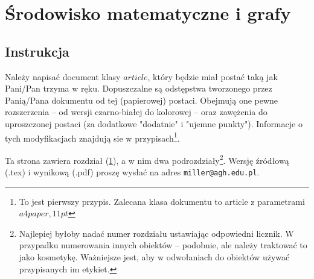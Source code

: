 \documentclass[a4paper,12pt]{article}
\begin{document}
    \section{Środowisko matematyczne i grafy}
    \label{r15}
        \subsection{Instrukcja}

        Należy napisać document klasy $article$, który będzie miał postać taką jak Pani/Pan trzyma w ręku.
        Dopuszczalne są odstępstwa tworzonego przez Panią/Pana dokumentu od tej (papierowej) postaci. Obejmują
        one pewne rozszerzenia -- od wersji czarno-białej do kolorowej -- oraz zawężenia do uproszczonej postaci (za dodatkowe "dodatnie" i "ujemne punkty"). Informacje o tych modyfikacjach znajdują sie w przypisach\footnote{To jest pierwszy przypis. Zalecana klasa dokumentu to article z parametrami $a4paper,11pt$}.

        Ta strona zawiera rozdział (\ref{r15}), a w nim dwa podrozdziały\footnote{
        Najlepiej byłoby nadać numer rozdziału ustawiając odpowiedni licznik. W przypadku numerowania innych obiektów -- podobnie, ale należy traktować to jako kosmetykę. Ważniejsze jest, aby w odwołaniach do obiektów używać przypisanych im etykiet.
        }. Wersję źródłową (.tex) i wynikową (.pdf) proszę wysłać na adres \texttt{miller@agh.edu.pl}.
\end{document}
